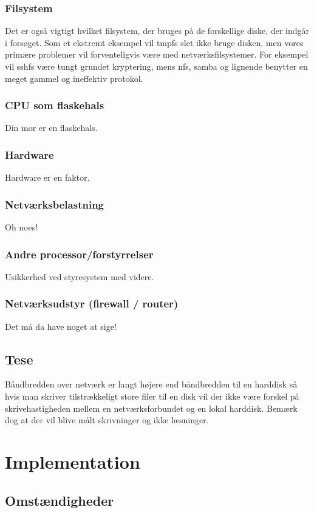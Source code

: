 \documentclass{article}
\begin{document}
\subsubsection{Filsystem}
Det er også vigtigt hvilket filsystem, der bruges på de forskellige diske, der indgår i forsøget. Som et ekstremt eksempel vil tmpfs slet ikke bruge disken, men vores primære problemer vil forventeligvis være med netværksfilsystemer. For eksempel vil sshfs være tungt grundet kryptering, mens nfs, samba og lignende benytter en meget gammel og ineffektiv protokol.

\subsubsection{CPU som flaskehals}
Din mor er en flaskehals.
\subsubsection{Hardware}
Hardware er en faktor.
\subsubsection{Netværksbelastning}
Oh noes!
\subsubsection{Andre processor/forstyrrelser}
Usikkerhed ved styresystem med videre.
\subsubsection{Netværksudstyr (firewall / router)}
Det må da have noget at sige!

\subsection{Tese}
Båndbredden over netværk er langt højere end båndbredden til en harddisk så hvis man skriver tilstrækkeligt store filer til en disk vil der ikke være forskel på skrivehastigheden mellem en netværksforbundet og en lokal harddisk. Bemærk dog at der vil blive målt skrivninger og ikke læsninger.

\section{Implementation}

\subsection{Omstændigheder}
\end{document}
